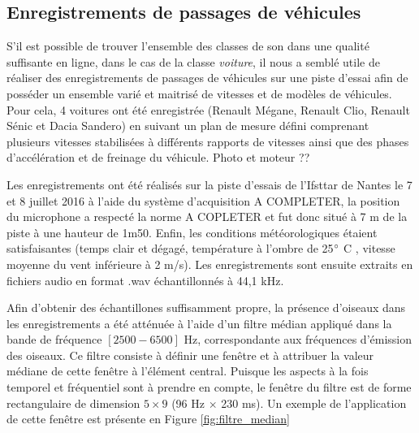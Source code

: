 \subsection{Enregistrements de passages de véhicules}
S'il est possible de trouver l'ensemble des classes de son dans une qualité suffisante en ligne, dans le cas de la classe \textit{voiture}, il nous a semblé utile de réaliser des enregistrements de passages de véhicules sur une piste d'essai afin de posséder un ensemble varié et maitrisé de vitesses et de modèles de véhicules. Pour cela, 4 voitures ont été enregistrée (Renault Mégane, Renault Clio, Renault Sénic et Dacia Sandero) en suivant un plan de mesure défini  comprenant plusieurs vitesses stabilisées à différents rapports de vitesses ainsi que des phases d'accélération et de freinage du véhicule.
Photo et moteur ??



Les enregistrements ont été réalisés sur la piste d'essais de l'Ifsttar de Nantes le 7 et 8 juillet 2016 à l'aide du système d'acquisition A COMPLETER, la position du microphone a respecté la norme A COPLETER et fut donc situé à 7 m de la piste à une hauteur de 1m50. Enfin, les conditions météorologiques étaient satisfaisantes (temps clair et dégagé, température à l'ombre de 25$\degree$ C , vitesse moyenne du vent inférieure à 2 m/s). Les enregistrements sont ensuite extraits en fichiers audio en format .wav échantillonnés à 44,1 kHz.
 
Afin d'obtenir des échantillones suffisamment propre, la présence d'oiseaux dans les enregistrements a été atténuée à l'aide d'un filtre médian \cite{fitzgerald_harmonic/percussive_2010} appliqué dans la bande de fréquence $\left[2500 - 6500\right]$ Hz, correspondante aux fréquences d'émission des oiseaux. Ce filtre consiste à définir une fenêtre et à attribuer la valeur médiane de cette fenêtre à l'élément central. Puisque les aspects à la fois temporel et fréquentiel sont à prendre en compte, le fenêtre du filtre est de forme rectangulaire de dimension $5 \times 9$ (96 Hz $\times$ 230 ms). Un exemple de l'application de cette fenêtre est présente en Figure \ref{fig:filtre_median}\\

